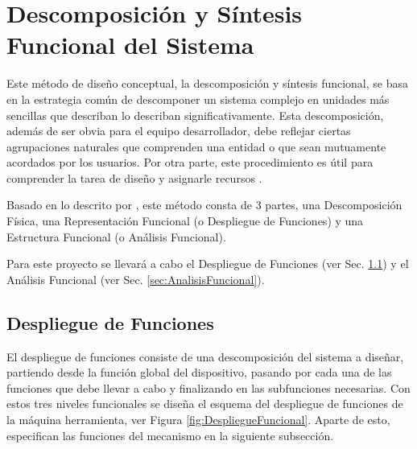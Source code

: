 \section{Descomposición y Síntesis Funcional del Sistema}
Este método de diseño conceptual, la descomposición y síntesis funcional, se basa en la estrategia común de descomponer un sistema complejo en unidades más sencillas que describan lo describan significativamente. Esta descomposición, además de ser obvia para el equipo desarrollador, debe reflejar ciertas agrupaciones naturales que comprenden una entidad o que sean mutuamente acordados por los usuarios. Por otra parte, este procedimiento es útil para comprender la tarea de diseño y asignarle recursos \citep{dieter2012engineering}. 

Basado en lo descrito por \cite{dieter2012engineering}, este método consta de 3 partes, una Descomposición Física, una Representación Funcional (o Despliegue de Funciones) y una Estructura Funcional (o Análisis Funcional).

Para este proyecto se llevará a cabo el Despliegue de Funciones (ver Sec. \ref{sec:DespliguedeFunciones}) y el Análisis Funcional (ver Sec. \ref{sec:AnalisisFuncional}).

\subsection{Despliegue de Funciones}
\label{sec:DespliguedeFunciones}

El despliegue de funciones consiste de una descomposición del sistema a diseñar, partiendo desde la función global del dispositivo, pasando por cada una de las funciones que debe llevar a cabo y finalizando en las subfunciones necesarias. Con estos tres niveles funcionales se diseña el esquema del despliegue de funciones de la máquina herramienta, ver Figura \ref{fig:DespliegueFuncional}. Aparte de esto, especifican las funciones del mecanismo en la siguiente subsección. 

